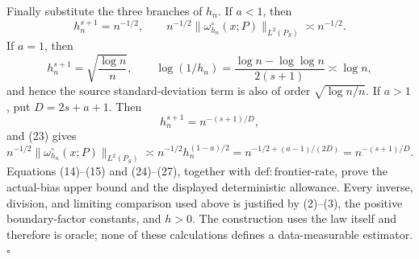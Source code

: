 Finally substitute the three branches of \(h_n\). If \(a<1\), then
\[
h_n^{s+1}=n^{-1/2},
\qquad n^{-1/2}\|\omega_{h_n}^{\circ}(x;P)\|_{L^2(P_S)}\asymp n^{-1/2}.
\tag{24}
\]
If \(a=1\), then
\[
h_n^{s+1}=\sqrt{\frac{\log n}{n}},
\qquad
\log(1/h_n)=\frac{\log n-\log\log n}{2(s+1)}\asymp\log n,
\tag{25}
\]
and hence the source standard-deviation term is also of order
\(\sqrt{\log n/n}\). If \(a>1\), put \(D=2s+a+1\). Then
\[
h_n^{s+1}=n^{-(s+1)/D},
\tag{26}
\]
and (23) gives
\[
n^{-1/2}\|\omega_{h_n}^{\circ}(x;P)\|_{L^2(P_S)}
\asymp n^{-1/2}h_n^{(1-a)/2}
=n^{-1/2+(a-1)/(2D)}
=n^{-(s+1)/D}.
\tag{27}
\]
Equations (14)--(15) and (24)--(27), together with
\(\mathrm{def:frontier\text{-}rate}\), prove the actual-bias upper bound and the displayed deterministic allowance. Every inverse, division, and limiting comparison used above is justified by (2)--(3), the positive boundary-factor constants, and \(h>0\). The construction uses the law itself and therefore is oracle; none of these calculations defines a data-measurable estimator. \(\square\)